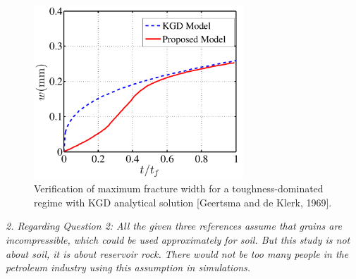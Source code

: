 \documentclass{elsarticle}
\newcommand{\review}[1]{ \textit{#1}}
\begin{document}
\begin{figure}[htbp]
	\centering
	\includegraphics[width=0.7\textwidth]{Width_KGD_water}
	\caption{Verification of maximum fracture width for a toughness-dominated regime with KGD analytical solution [Geertsma and de Klerk, 1969].}
	\label{Fig:KGD_width_water}
\end{figure}


\bigskip
    \review{2. Regarding Question 2:
    	All the given three references assume that grains are incompressible, which could be used approximately for soil. But this study is not about soil, it is about reservoir rock. There would not be too many people in the petroleum industry using this assumption in simulations.}
    	\bigskip
    	
\end{document}
